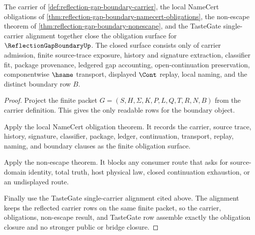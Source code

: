 \begin{theorem}
\label{thm:reflection-gap-boundary-obligation-closure}
The carrier of \autoref{def:reflection-gap-boundary-carrier}, the local NameCert obligations of \autoref{thm:reflection-gap-boundary-namecert-obligations}, the non-escape theorem of \autoref{thm:reflection-gap-boundary-nonescape}, and the TasteGate single-carrier alignment together close the obligation surface for $\ReflectionGapBoundaryUp$. The closed surface consists only of carrier admission, finite source-trace exposure, history and signature extraction, classifier fit, package provenance, ledgered gap accounting, open-continuation preservation, componentwise $\hsame$ transport, displayed $\Cont$ replay, local naming, and the distinct boundary row $B$.
\end{theorem}
\begin{proof}
Project the finite packet $G=(S,H,\Sigma,K,P,L,Q,T,R,N,B)$ from the carrier definition. This gives the only readable rows for the boundary object.

Apply the local NameCert obligation theorem. It records the carrier, source trace, history, signature, classifier, package, ledger, continuation, transport, replay, naming, and boundary clauses as the finite obligation surface.

Apply the non-escape theorem. It blocks any consumer route that asks for source-domain identity, total truth, host physical law, closed continuation exhaustion, or an undisplayed route.

Finally use the TasteGate single-carrier alignment cited above. The alignment keeps the reflected carrier rows on the same finite packet, so the carrier, obligations, non-escape result, and TasteGate row assemble exactly the obligation closure and no stronger public or bridge closure.
\end{proof}

